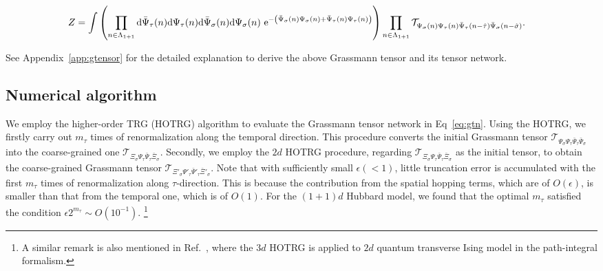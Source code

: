 \documentclass[nofootinbib,prd,aps,superscriptaddress,preprintnumbers,twocolumn,showpacs]{revtex4-1}
\begin{document}
\begin{widetext}
	\begin{align}
\label{eq:gtn}
	Z&=\int\left(\prod_{n\in\Lambda_{1+1}}{\rm d}\bar{\Psi}_{\tau}(n){\rm d}\Psi_{\tau}(n){\rm d}\bar{\Psi}_{\sigma}(n){\rm d}\Psi_{\sigma}(n)~{\rm e}^{-\left(\bar{\Psi}_{\sigma}(n)\Psi_{\sigma}(n)+\bar{\Psi}_{\tau}(n)\Psi_{\tau}(n)\right)}\right)\prod_{n\in\Lambda_{1+1}}\mathcal{T}_{\Psi_{\sigma}(n)\Psi_{\tau}(n)\bar{\Psi}_{\tau}(n-\hat{\tau})\bar{\Psi}_{\sigma}(n-\hat{\sigma})}.
\end{align}
\end{widetext}
See Appendix~\ref{app:gtensor} for the detailed explanation to derive the above Grassmann tensor and its tensor network.

\subsection{Numerical algorithm}
\label{subsec:algorithm}

We employ the higher-order TRG (HOTRG) algorithm \cite{PhysRevB.86.045139} to evaluate the Grassmann tensor network in Eq~\eqref{eq:gtn}. Using the HOTRG, we firstly carry out $m_{\tau}$ times of renormalization along the temporal direction. This procedure converts the initial Grassmann tensor $\mathcal{T}_{\Psi_{\sigma}\Psi_{\tau}\bar{\Psi}_{\tau}\bar{\Psi}_{\sigma}}$ into the coarse-grained one $\mathcal{T}_{\Xi_{\sigma}\Psi_{\tau}\bar{\Psi}_{\tau}\bar{\Xi}_{\sigma}}$. Secondly, we employ the $2d$ HOTRG procedure, regarding $\mathcal{T}_{\Xi_{\sigma}\Psi_{\tau}\bar{\Psi}_{\tau}\bar{\Xi}_{\sigma}}$ as the initial tensor, to obtain the coarse-grained Grassmann tensor $\mathcal{T}_{\Xi'_{\sigma}\Psi'_{\tau}\bar{\Psi}'_{\tau}\bar{\Xi}'_{\sigma}}$. Note that with sufficiently small $\epsilon(<1)$, little truncation error is accumulated with the first $m_{\tau}$ times of renormalization along $\tau$-direction. This is because the contribution from the spatial hopping terms, which are of $O(\epsilon)$, is smaller than that from the temporal one, which is of $O(1)$. For the $(1+1)d$ Hubbard model, we found that the optimal $m_{\tau}$ satisfied the condition $\epsilon 2^{m_{\tau}}\sim O(10^{-1})$. \footnote{A similar remark is also mentioned in Ref.~\cite{PhysRevB.86.045139}, where the $3d$ HOTRG is applied to $2d$ quantum transverse Ising model in the path-integral formalism.}
\end{document}
